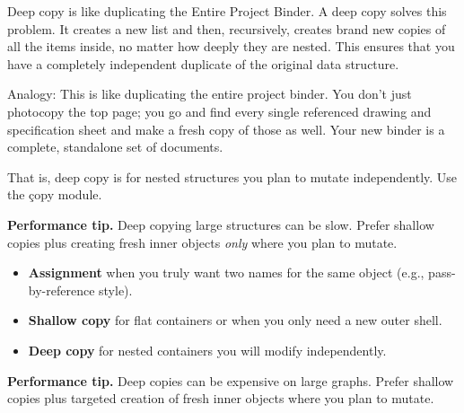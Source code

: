 Deep copy is like duplicating the Entire Project Binder. A deep copy solves this problem. It creates a new list and then, recursively, creates brand new copies of all the items inside, no matter how deeply they are nested. This ensures that you have a completely independent duplicate of the original data structure.\par
Analogy: This is like duplicating the entire project binder. You don't just photocopy the top page; you go and find every single referenced drawing and specification sheet and make a fresh copy of those as well. Your new binder is a complete, standalone set of documents.\par
That is, deep copy is for nested structures you plan to mutate independently. Use the \c{copy} module.
\begin{NoteBox}
\textbf{Performance tip.} Deep copying large structures can be slow. Prefer shallow copies plus creating fresh inner
objects \emph{only} where you plan to mutate.
\end{NoteBox}



\begin{itemize}
  \item \textbf{Assignment} when you truly want two names for the same object (e.g., pass-by-reference style).
  \item \textbf{Shallow copy} for flat containers or when you only need a new outer shell.
  \item \textbf{Deep copy} for nested containers you will modify independently.
\end{itemize}

\begin{NoteBox}
\textbf{Performance tip.} Deep copies can be expensive on large graphs. Prefer shallow copies plus
targeted creation of fresh inner objects where you plan to mutate.
\end{NoteBox}

